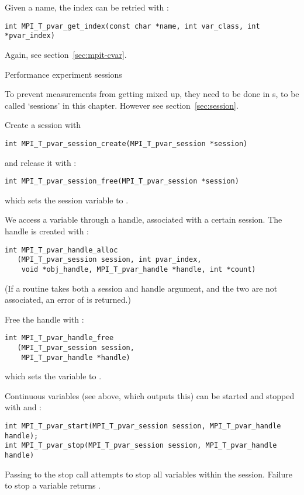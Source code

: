 \begin{mpifour}
Given a name, the index can be retried with :
\begin{lstlisting}
int MPI_T_pvar_get_index(const char *name, int var_class, int *pvar_index)
\end{lstlisting}
Again, see section~\ref{sec:mpit-cvar}.

 {Performance experiment sessions}

To prevent measurements from getting mixed up, they need to be done in
s,
to be called `sessions' in this chapter.
However see section~\ref{sec:session}.

Create a session with 
\begin{lstlisting}
int MPI_T_pvar_session_create(MPI_T_pvar_session *session)
\end{lstlisting}
and release it with :
\begin{lstlisting}
int MPI_T_pvar_session_free(MPI_T_pvar_session *session)
\end{lstlisting}
which sets the session variable to .

We access a variable through a handle, associated with a certain session.
The handle is created with :
\begin{lstlisting}
int MPI_T_pvar_handle_alloc
   (MPI_T_pvar_session session, int pvar_index,
    void *obj_handle, MPI_T_pvar_handle *handle, int *count)
\end{lstlisting}
(If a routine takes both a session and handle argument, and
the two are not associated, an error of 
is returned.)

Free the handle with :
\begin{lstlisting}
int MPI_T_pvar_handle_free
   (MPI_T_pvar_session session,
    MPI_T_pvar_handle *handle)
\end{lstlisting}
which sets the variable to .

Continuous variables (see  above, which outputs this)
can be started and stopped with
 and :
\begin{lstlisting}
int MPI_T_pvar_start(MPI_T_pvar_session session, MPI_T_pvar_handle handle);
int MPI_T_pvar_stop(MPI_T_pvar_session session, MPI_T_pvar_handle handle)
\end{lstlisting}
Passing  to the stop call
attempts to stop all variables within the session.
Failure to stop a variable returns .


\end{mpifour}
